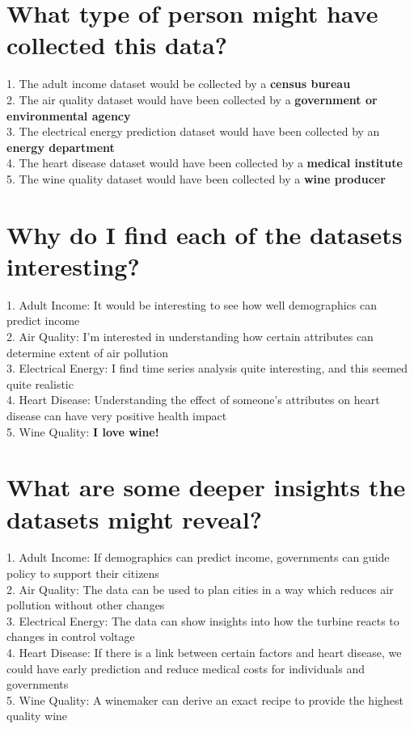 \documentclass[11pt]{article}
\begin{document}
\section{What type of person might have collected this data?}
1. The adult income dataset would be collected by a \textbf{census bureau} \\
2. The air quality dataset would have been collected by a \textbf{government or environmental agency} \\
3. The electrical energy prediction dataset would have been collected by an \textbf{energy department} \\
4. The heart disease dataset would have been collected by a \textbf{medical institute} \\
5. The wine quality dataset would have been collected by a \textbf{wine producer}

\section{Why do I find each of the datasets interesting?}
1. Adult Income: It would be interesting to see how well demographics can predict income \\
2. Air Quality: I'm interested in understanding how certain attributes can determine extent of air pollution \\
3. Electrical Energy: I find time series analysis quite interesting, and this seemed quite realistic \\
4. Heart Disease: Understanding the effect of someone's attributes on heart disease can have very positive health impact \\
5. Wine Quality: \textbf{I love wine!}

\section{What are some deeper insights the datasets might reveal?}
1. Adult Income: If demographics can predict income, governments can guide policy to support their citizens \\
2. Air Quality: The data can be used to plan cities in a way which reduces air pollution without other changes \\
3. Electrical Energy: The data can show insights into how the turbine reacts to changes in control voltage \\
4. Heart Disease: If there is a link between certain factors and heart disease, we could have early prediction and reduce medical costs for individuals and governments \\
5. Wine Quality: A winemaker can derive an exact recipe to provide the highest quality wine
\end{document}
